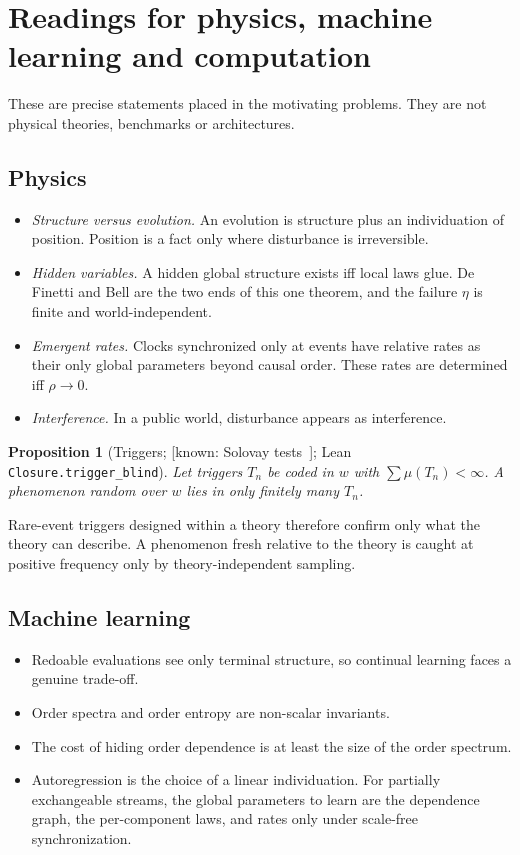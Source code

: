 \documentclass[11pt]{article}
\newtheorem{proposition}[theorem]{Proposition}
\theoremstyle{definition}
\theoremstyle{remark}
\newcommand{\lean}[1]{\texttt{#1}}
\newcommand{\status}[1]{\textsf{[#1]}}
\begin{document}
\section{Readings for physics, machine learning and computation}\label{sec:readings}

These are precise statements placed in the motivating problems. They are not physical theories, benchmarks or architectures.

\subsection{Physics}
\begin{itemize}
\item \emph{Structure versus evolution.} An evolution is structure plus an individuation of position. Position is a fact only where disturbance is irreversible.
\item \emph{Hidden variables.} A hidden global structure exists iff local laws glue. De Finetti and Bell are the two ends of this one theorem, and the failure $\eta$ is finite and world-independent.
\item \emph{Emergent rates.} Clocks synchronized only at events have relative rates as their only global parameters beyond causal order. These rates are determined iff $\rho\to0$.
\item \emph{Interference.} In a public world, disturbance appears as interference.
\end{itemize}

\begin{proposition}[Triggers; \status{known: Solovay tests~\cite{DowneyHirschfeldt10}}; Lean \lean{Closure.trigger\_blind}]
Let triggers $T_n$ be coded in $w$ with $\sum\mu(T_n)<\infty$. A phenomenon random over $w$ lies in only finitely many $T_n$.
\end{proposition}

\noindent Rare-event triggers designed within a theory therefore confirm only what the theory can describe. A phenomenon fresh relative to the theory is caught at positive frequency only by theory-independent sampling.

\subsection{Machine learning}
\begin{itemize}
\item Redoable evaluations see only terminal structure, so continual learning faces a genuine trade-off.
\item Order spectra and order entropy are non-scalar invariants.
\item The cost of hiding order dependence is at least the size of the order spectrum.
\item Autoregression is the choice of a linear individuation. For partially exchangeable streams, the global parameters to learn are the dependence graph, the per-component laws, and rates only under scale-free synchronization.
\end{itemize}
\end{document}
